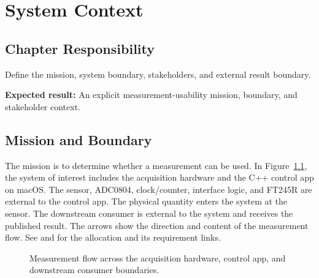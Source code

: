 \chapter{System Context}
\section{Chapter Responsibility}
\label{Section:SystemContextResponsibility}
Define the mission, system boundary, stakeholders, and external result boundary.

\noindent\textbf{Expected result:} An explicit measurement-usability mission, boundary, and stakeholder context.

\section{Mission and Boundary}
\label{Section:MeasurementMission}
The mission is to determine whether a measurement can be used. In
Figure~\ref{Figure:SensorContext}, the system of interest includes the
acquisition hardware and the C++ control app on macOS. The sensor, ADC0804,
clock/counter, interface logic, and FT245R are external to the control app.
The physical quantity enters the system at the sensor. The downstream
consumer is external to the system and receives the published result.
The arrows show the direction and content of the measurement flow. See
 and  for the allocation
and its requirement links.
\begin{figure}[!htbp]
\centering

\caption{Measurement flow across the acquisition hardware, control app, and downstream consumer boundaries.}
\label{Figure:SensorContext}
\end{figure}

